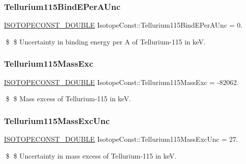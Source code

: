 \subsubsection{\texorpdfstring{Tellurium115\+Bind\+E\+Per\+A\+Unc}{Tellurium115BindEPerAUnc}}
{\footnotesize\ttfamily \mbox{\hyperlink{group___isotope_const-_macros_ga8f45a7272ce02c0b4c65c44636ed719a}{I\+S\+O\+T\+O\+P\+E\+C\+O\+N\+S\+T\+\_\+\+D\+O\+U\+B\+LE}} Isotope\+Const\+::\+Tellurium115\+Bind\+E\+Per\+A\+Unc = 0.}

\$ \$ Uncertainty in binding energy per A of Tellurium-\/115 in keV. \mbox{\label{group___isotope_const-_tellurium-_te115_ga1131daf64cdb74ddb17e3586bb884c6e}} 
\subsubsection{\texorpdfstring{Tellurium115\+Mass\+Exc}{Tellurium115MassExc}}
{\footnotesize\ttfamily \mbox{\hyperlink{group___isotope_const-_macros_ga8f45a7272ce02c0b4c65c44636ed719a}{I\+S\+O\+T\+O\+P\+E\+C\+O\+N\+S\+T\+\_\+\+D\+O\+U\+B\+LE}} Isotope\+Const\+::\+Tellurium115\+Mass\+Exc = -\/82062.}

\$ \$ Mass excess of Tellurium-\/115 in keV. \mbox{\label{group___isotope_const-_tellurium-_te115_gaf9c202472b2cb9b1fd03ea7a36ea6cd7}} 
\subsubsection{\texorpdfstring{Tellurium115\+Mass\+Exc\+Unc}{Tellurium115MassExcUnc}}
{\footnotesize\ttfamily \mbox{\hyperlink{group___isotope_const-_macros_ga8f45a7272ce02c0b4c65c44636ed719a}{I\+S\+O\+T\+O\+P\+E\+C\+O\+N\+S\+T\+\_\+\+D\+O\+U\+B\+LE}} Isotope\+Const\+::\+Tellurium115\+Mass\+Exc\+Unc = 27.}

\$ \$ Uncertainty in mass excess of Tellurium-\/115 in keV. \mbox{\label{group___isotope_const-_tellurium-_te115_ga292000bc8d2d47d8b9a057eee1d80890}} 
